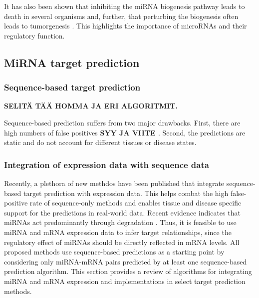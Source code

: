 It has also been shown that inhibiting the miRNA biogenesis pathway
leads to death in several organisms \cite{CITE} and, further, that
perturbing the biogenesis often leads to tumorgenesis \cite{CITE}. This
highlights the importance of microRNAs and their regulatory function.









\subsection{MiRNA target prediction}\label{mirna-target-prediction}


\subsubsection{Sequence-based target
prediction}\label{sequence-based-target-prediction}

\textbf{SELITÄ TÄÄ HOMMA JA ERI ALGORITMIT.}

Sequence-based prediction suffers from two major drawbacks. First, there
are high numbers of false positives \textbf{SYY JA VIITE
\cite{Sethupathy2006?}}. Second, the predictions are static and do not
account for different tissues or disease states.


\subsubsection{Integration of expression data with sequence
data}\label{integration-of-expression-data-with-sequence-data}

Recently, a plethora of new methdos have been published that integrate
sequence-based target prediction with expression data. This helps combat
the high false-positive rate of sequence-only methods and enables tissue
and disease specific support for the predictions in real-world data.
Recent evidence indicates that miRNAs act predominantly through
degradation \cite{CITE}. Thus, it is feasible to use miRNA and mRNA
expression data to infer target relationships, since the regulatory
effect of miRNAs should be directly reflected in mRNA levels. All
proposed methods use sequence-based predictions as a starting point by
considering only miRNA-mRNA pairs predicted by at least one
sequence-based prediction algorithm. This section provides a review of
algorithms for integrating miRNA and mRNA expression and implementations
in select target prediction methods.

